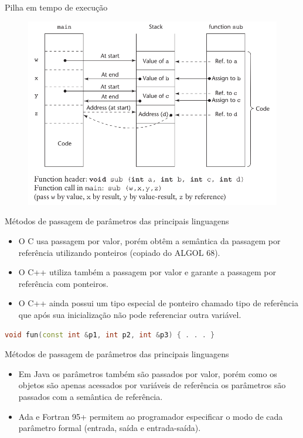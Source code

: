 \begin{frame}[fragile]{Pilha em tempo de execução}
	\begin{figure}[ht!]
	 \centering
	 \includegraphics[scale=0.3]{./imgs/run-time-stack.png}
	\label{run-time-stack}
	\end{figure}
\end{frame}

\begin{frame}[fragile]{Métodos de passagem de parâmetros das principais linguagens}
	\begin{itemize}
	  \item O C usa passagem por valor, porém obtêm a semântica da passagem por referência utilizando ponteiros (copiado do ALGOL 68).
	  \item O C++ utiliza também a passagem por valor e garante a passagem por referência com ponteiros.
	  \item O C++ ainda possui um tipo especial de ponteiro chamado tipo de referência que após sua inicialização não pode referenciar outra variável.
	\end{itemize}
	
	\begin{lstlisting}[language=c++]
		void fun(const int &p1, int p2, int &p3) { . . . }
	\end{lstlisting}	
\end{frame}

\begin{frame}[fragile]{Métodos de passagem de parâmetros das principais linguagens}
	\begin{itemize}
	  \item Em Java os parâmetros também são passados por valor, porém como os objetos são apenas acessados por variáveis de referência os parâmetros são passados com a semântica de referência.
	  \item Ada e Fortran 95+ permitem ao programador especificar o modo de cada parâmetro formal (entrada, saída e entrada-saída).
	\end{itemize}
\end{frame}
 


